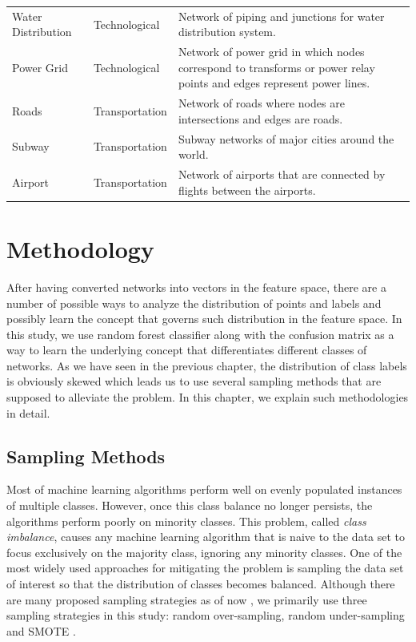 \documentclass{article}
\begin{document}
\begin{longtable}{| l | l | p{9cm} |}
      Water Distribution &  Technological & Network of piping and junctions for water distribution system.\\ %
      Power Grid &  Technological & Network of power grid in which nodes correspond to transforms or power relay points and edges represent power lines.\\ %
      Roads &  Transportation & Network of roads where nodes are intersections and edges are roads.\\ %
      Subway &  Transportation & Subway networks of major cities around the world.\\ %
      Airport &  Transportation & Network of airports that are connected by flights between the airports.\\  \hline
           
\end{longtable}


\newpage
\section{Methodology}
After having converted networks into vectors in the feature space, there are a number of possible ways to analyze the distribution of points and labels and possibly learn the concept that governs such distribution in the feature space. In this study, we use random forest classifier along with the confusion matrix as a way to learn the underlying concept that differentiates different classes of networks. As we have seen in the previous chapter, the distribution of class labels is obviously skewed which leads us to use several sampling methods that are supposed to alleviate the problem. In this chapter, we explain such methodologies in detail.

	\subsection{Sampling Methods}
Most of machine learning algorithms perform well on evenly populated instances of multiple classes. However, once this class balance no longer persists, the algorithms perform poorly on minority classes. This problem, called \textit{class imbalance}, causes any machine learning algorithm that is naive to the data set to focus exclusively on the majority class, ignoring any minority classes. One of the most widely used approaches for mitigating the problem is sampling the data set of interest so that the distribution of classes becomes balanced. Although there are many proposed sampling strategies as of now \cite{SurveySampling}, we primarily use three sampling strategies in this study: random over-sampling, random under-sampling and SMOTE \cite{SMOTE}.
\end{document}
